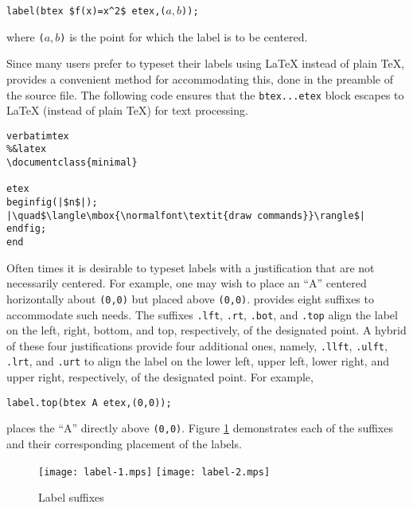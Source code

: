 \begin{center}
  \verb|label(btex $f(x)=x^2$ etex,(|$a,b$\verb|));|
\end{center}

where \verb|(|$a,b$\verb|)| is the point for which the label is to be
centered.

Since many \MP{} users prefer to typeset their labels using \LaTeX{}
instead of plain \TeX, \MP{} provides a convenient method for
accommodating this, done in the preamble of the \MP{} source file.  The
following code ensures that the \verb|btex...etex| block escapes to
\LaTeX{} (instead of plain \TeX) for text processing.

\begin{lstlisting}[xleftmargin=56bp]
verbatimtex
%&latex
\documentclass{minimal}

etex
beginfig(|$n$|);
|\quad$\langle\mbox{\normalfont\textit{draw commands}}\rangle$|
endfig;
end
\end{lstlisting}

Often times it is desirable to typeset labels with a justification that
are not necessarily centered.  For example, one may wish to place an
``A'' centered horizontally about \texttt{(0,0)} but placed above
\texttt{(0,0)}. \MP{} provides eight suffixes to accommodate such needs.
The suffixes \texttt{.lft}, \texttt{.rt}, \texttt{.bot}, and
\texttt{.top} align the label on the left, right, bottom, and top,
respectively, of the designated point.  A hybrid of these four
justifications provide four additional ones, namely, \texttt{.llft},
\texttt{.ulft}, \texttt{.lrt}, and \texttt{.urt} to align the label on
the lower left, upper left, lower right, and upper right, respectively,
of the designated point.  For example,

\begin{center}
  \verb|label.top(btex A etex,(0,0));|
\end{center}

places the ``A'' directly above \texttt{(0,0)}.  Figure \ref{fig:label}
demonstrates each of the suffixes and their corresponding placement of
the labels.

\begin{figure}
  \hfill%
  \texttt{[image: label-1.mps]}
  \hfill%
  \texttt{[image: label-2.mps]}
  \hfill\mbox{}
  \caption{Label suffixes}
  \label{fig:label}
\end{figure}

